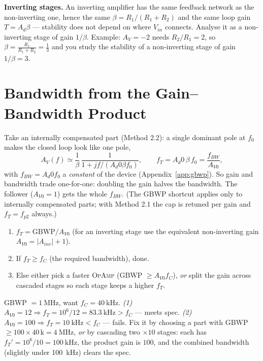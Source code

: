 \documentclass[11pt,a4paper,oneside]{book}
\newcommand{\Ad}{A_d}
\newcommand{\op}{\textsc{OpAmp}}
\begin{document}
\begin{note}
\textbf{Inverting stages.} An inverting amplifier has the same feedback network as
the non-inverting one, hence the same $\beta=R_1/(R_1+R_2)$ and the same loop gain
$T=\Ad\beta$ --- stability does not depend on where $V_{in}$ connects. Analyse it
as a non-inverting stage of gain $1/\beta$. Example: $A_V=-2$ needs $R_2/R_1=2$,
so $\beta=\tfrac{R_1}{R_1+R_2}=\tfrac13$ and you study the stability of a
non-inverting stage of gain $1/\beta=3$.
\end{note}

\section{Bandwidth from the Gain--Bandwidth Product}
Take an internally compensated part (Method 2.2): a single dominant pole at $f_0$
makes the closed loop look like one pole,
\[
  A_V(f)\simeq\frac1\beta\,\frac{1}{1+jf/(\Ad0\beta f_0)},\qquad
  f_T=\Ad0\,\beta\,f_0=\frac{f_{BW}}{A_{V0}},
\]
with $f_{BW}=\Ad0 f_0$ a \emph{constant} of the device (Appendix~\ref{app:gbwp}).
So gain and bandwidth trade one-for-one: doubling the gain halves the bandwidth.
The follower ($A_{V0}=1$) gets the whole $f_{BW}$. (The GBWP shortcut applies only
to internally compensated parts; with Method 2.1 the cap is retuned per gain and
$f_T=f_{p2}$ always.)

\begin{protocol}
\begin{enumerate}[leftmargin=1.5cm]
  \item $f_T=\text{GBWP}/A_{V0}$ (for an inverting stage use the equivalent
        non-inverting gain $A_{V0}=|A_{inv}|+1$).
  \item If $f_T\ge f_C$ (the required bandwidth), done.
  \item Else either pick a faster \op{} (GBWP $\ge A_{V0}f_C$), \emph{or} split
        the gain across cascaded stages so each stage keeps a higher $f_T$.
\end{enumerate}
\end{protocol}

\begin{wexample}
GBWP $=\qty{1}{\mega\hertz}$, want $f_C=\qty{40}{\kilo\hertz}$.
\emph{(1)} $A_{V0}=12\Rightarrow f_T=10^6/12=\qty{83.3}{\kilo\hertz}>f_C$ --- meets
spec. \emph{(2)} $A_{V0}=100\Rightarrow f_T=\qty{10}{\kilo\hertz}<f_C$ --- fails.
Fix it by choosing a part with GBWP $\ge100\times40\,\text{k}=\qty{4}{\mega\hertz}$,
\emph{or} by cascading two $\times10$ stages: each has
$f_T'=10^6/10=\qty{100}{\kilo\hertz}$, the product gain is $100$, and the combined
bandwidth (slightly under \qty{100}{\kilo\hertz}) clears the spec.
\end{wexample}
\end{document}

